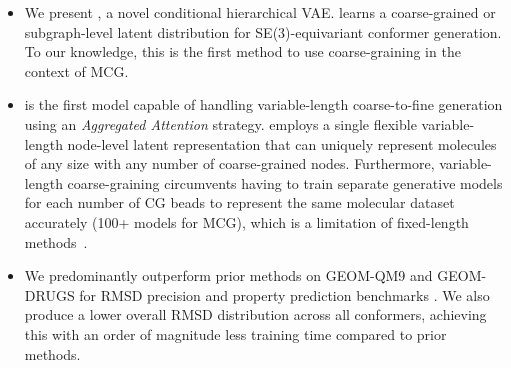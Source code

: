 \begin{itemize}
\item We present \modelns, a novel conditional hierarchical VAE. \model learns a coarse-grained or subgraph-level latent distribution for SE(3)-equivariant conformer generation.
To our knowledge, this is the first method to use coarse-graining in the context of MCG.%

\item \model is the first model capable of handling variable-length coarse-to-fine generation using an \textit{Aggregated Attention} strategy. 
\model employs a single flexible variable-length node-level latent representation that can uniquely represent molecules of any size with any number of coarse-grained nodes. 
Furthermore, variable-length coarse-graining circumvents having to train separate generative models for each number of CG beads to represent the same molecular dataset accurately (100+ models for MCG), which is a limitation of fixed-length methods~\citep{CGProtein}.

\item We predominantly outperform prior methods on GEOM-QM9 and GEOM-DRUGS for RMSD precision and property prediction benchmarks \citep{GEOM}. We also produce a lower overall RMSD distribution across all conformers, achieving this with an order of magnitude less training time compared to prior methods. 


\end{itemize}
